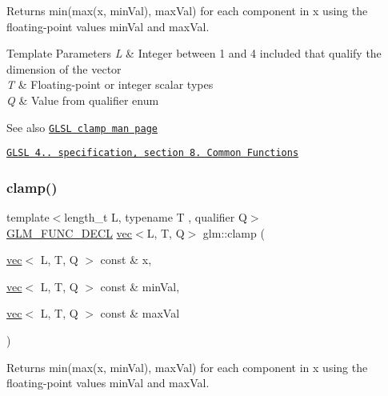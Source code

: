 Returns min(max(x, min\+Val), max\+Val) for each component in x using the floating-\/point values min\+Val and max\+Val.


\begin{DoxyTemplParams}{Template Parameters}
{\em L} & Integer between 1 and 4 included that qualify the dimension of the vector \\
\hline
{\em T} & Floating-\/point or integer scalar types \\
\hline
{\em Q} & Value from qualifier enum\\
\hline
\end{DoxyTemplParams}
\begin{DoxySeeAlso}{See also}
\href{http://www.opengl.org/sdk/docs/manglsl/xhtml/clamp.xml}{\tt G\+L\+SL clamp man page} 

\href{http://www.opengl.org/registry/doc/GLSLangSpec.4.20.8.pdf}{\tt G\+L\+SL 4.. specification, section 8. Common Functions} 
\end{DoxySeeAlso}
\mbox{\label{group__core__func__common_ga748333282a6f2f87762c0a4739c8c364}} 
\subsubsection{\texorpdfstring{clamp()}{clamp()}\hspace{0.1cm}{\footnotesize\ttfamily [3/3]}}
{\footnotesize\ttfamily template$<$length\+\_\+t L, typename T , qualifier Q$>$ \\
\hyperlink{setup_8hpp_ab2d052de21a70539923e9bcbf6e83a51}{G\+L\+M\+\_\+\+F\+U\+N\+C\+\_\+\+D\+E\+CL} \hyperlink{structglm_1_1vec}{vec}$<$L, T, Q$>$ glm\+::clamp (\begin{DoxyParamCaption}\item[{\hyperlink{structglm_1_1vec}{vec}$<$ L, T, Q $>$ const \&}]{x,  }\item[{\hyperlink{structglm_1_1vec}{vec}$<$ L, T, Q $>$ const \&}]{min\+Val,  }\item[{\hyperlink{structglm_1_1vec}{vec}$<$ L, T, Q $>$ const \&}]{max\+Val }\end{DoxyParamCaption})}

Returns min(max(x, min\+Val), max\+Val) for each component in x using the floating-\/point values min\+Val and max\+Val.


